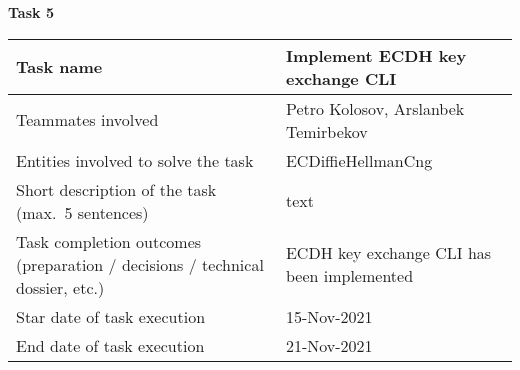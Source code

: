 \vskip 5mm
\hspace*{-6mm}\textbf{Task 5}\\[2mm]
\begin{tabular}{|p{}|p{}|}
    \hline
    Task name                                                                    & Implement ECDH key exchange CLI            \\
    \hline
    Teammates involved                                                           & Petro Kolosov, Arslanbek Temirbekov        \\
    \hline
    Entities involved to solve the task                                          & ECDiffieHellmanCng                         \\
    \hline
    Short description of the task (max.\ 5 sentences)                            & text                               \\
    \hline
    Task completion outcomes (preparation / decisions / technical dossier, etc.) & ECDH key exchange CLI has been implemented \\
    \hline
    Star date of task execution                                                  & 15-Nov-2021                                \\
    \hline
    End date of task execution                                                   & 21-Nov-2021                                \\
    \hline
\end{tabular}